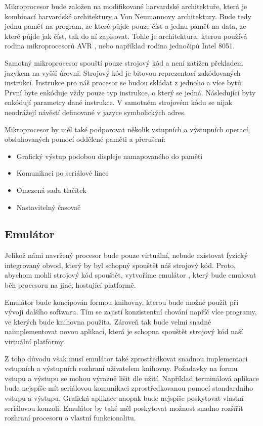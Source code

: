 Mikroprocesor bude založen na modifikované harvardské architektuře, která je kombinací harvardské architektury a Von Neumannovy architektury.  Bude tedy jednu paměť na program, ze které půjde pouze číst a jednu paměť na data, ze které půjde jak číst, tak do ní zapisovat. Tohle je architektura, kterou používá rodina mikroprocesorů AVR , nebo například rodina jednočipů Intel 8051. 

Samotný mikroprocesor spouští pouze strojový kód a není zatížen překladem jazykem na vyšší úrovni. Strojový kód je bitovou reprezentací zakódovaných instrukcí. Instrukce pro náš procesor se budou skládat z jednoho a více bytů. První byte enkóduje vždy pouze typ instrukce, o který se jedná. Následující byty enkódují parametry dané instrukce. V samotném strojovém kódu se nijak neodrážejí návěstí definované v jazyce symbolických adres.

Mikroprocesor by měl také podporovat několik vstupních a výstupních operací, obsluhovaných pomocí oddělené paměti a přerušení:

\begin{itemize}
	\item Grafický výstup podobou displeje namapovaného do paměti
	\item Komunikaci po seriálové lince
	\item Omezená sada tlačítek
	\item Nastavitelný časovač
\end{itemize}

\subsection{Emulátor}

Jelikož námi navržený procesor bude pouze virtuální, nebude existovat fyzický integrovaný obvod, který by byl schopný spouštět náš strojový kód. Proto, abychom mohli strojový kód spouštět, vytvoříme emulátor , který bude emulovat běh procesoru na jiné, hostující platformě.

Emulátor bude koncipován formou knihovny, kterou bude možné použít při vývoji dalšího softwaru. Tím se zajistí konzistentní chování napříč více programy, ve kterých bude knihovna použita. Zároveň tak bude velmi snadné naimplementovat novou aplikaci, která je schopna spouštět strojový kód naší virtuální platformy.

Z toho důvodu však musí emulátor také zprostředkovat snadnou implementaci vstupních a výstupních rozhraní uživatelem knihovny. Požadavky na formu vstupu a výstupu se mohou výrazně lišit dle užití. Například terminálová aplikace bude nejspíše mít seriálovou komunikaci zprostředkovanou pomocí standardního vstupu a výstupu. Grafická aplikace naopak bude nejspíše poskytovat vlastní seriálovou konzoli. Emulátor by také měl poskytovat možnost snadno rozšířit rozhraní procesoru o vlastní funkcionalitu.


